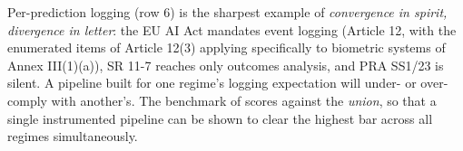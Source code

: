 Per-prediction logging (row 6) is the sharpest example of \emph{convergence in spirit, divergence in letter}: the EU AI Act mandates event logging (Article 12, with the enumerated items of Article 12(3) applying specifically to biometric systems of Annex III(1)(a)), SR 11-7 reaches only outcomes analysis, and PRA SS1/23 is silent. A pipeline built for one regime's logging expectation will under- or over-comply with another's. The benchmark of  scores against the \emph{union}, so that a single instrumented pipeline can be shown to clear the highest bar across all regimes simultaneously.
